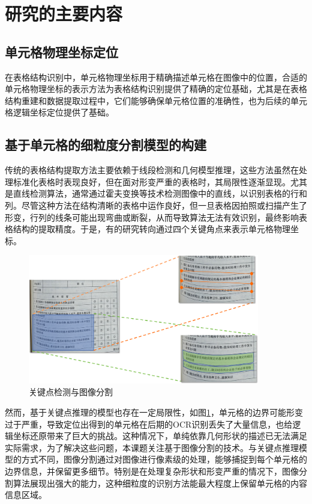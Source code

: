 \documentclass[../article.tex]{subfiles} %
\begin{document}
\section{研究的主要内容}
\subsection{单元格物理坐标定位}

在表格结构识别中，单元格物理坐标用于精确描述单元格在图像中的位置，合适的单元格物理坐标的表示方法为表格结构识别提供了精确的定位基础，尤其是在表格结构重建和数据提取过程中，它们能够确保单元格位置的准确性，也为后续的单元格逻辑坐标定位提供了基础。

\subsection{基于单元格的细粒度分割模型的构建}

传统的表格结构提取方法主要依赖于线段检测和几何模型推理，这些方法虽然在处理标准化表格时表现良好，但在面对形变严重的表格时，其局限性逐渐显现。尤其是直线检测算法，通常通过霍夫变换等技术检测图像中的直线，以识别表格的行和列。尽管这种方法在结构清晰的表格中运作良好，但一旦表格因拍照或扫描产生了形变，行列的线条可能出现弯曲或断裂，从而导致算法无法有效识别，最终影响表格结构的提取精度。于是，有的研究转向通过四个关键角点来表示单元格物理坐标。

\begin{figure}[H]
    \centering
    \includegraphics[width=0.9\textwidth]{point.png}
    \caption{关键点检测与图像分割}
    \label{fig:p}
\end{figure}

然而，基于关键点推理的模型也存在一定局限性，如图\ref{fig:p}，单元格的边界可能形变过于严重，导致定位出得到的单元格在后期的OCR识别丢失了大量信息，也给逻辑坐标还原带来了巨大的挑战。这种情况下，单纯依靠几何形状的描述已无法满足实际需求，为了解决这些问题，本课题关注基于图像分割的技术。与关键点推理模型的方式不同，图像分割通过对图像进行像素级的处理，能够捕捉到每个单元格的边界信息，并保留更多细节。特别是在处理复杂形状和形变严重的情况下，图像分割算法展现出强大的能力，这种细粒度的识别方法能最大程度上保留单元格的内容信息区域。
\end{document}
